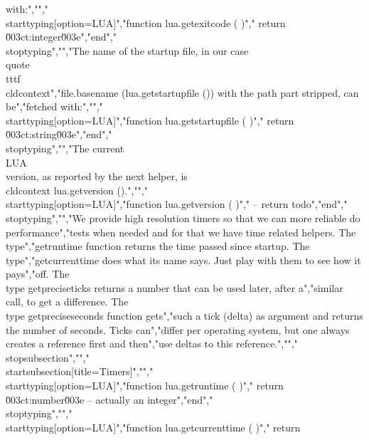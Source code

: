 with:","","\\starttyping[option=LUA]","function lua.getexitcode ( )","    return \u003ct:integer\u003e","end","\\stoptyping","","The name of the startup file, in our case \\quote {\\tttf \\cldcontext","{file.basename (lua.getstartupfile ())}} with the path part stripped, can be","fetched with:","","\\starttyping[option=LUA]","function lua.getstartupfile ( )","    return \u003ct:string\u003e","end","\\stoptyping","","The current \\LUA\\ version, as reported by the next helper, is \\cldcontext {lua.getversion ()}.","","\\starttyping[option=LUA]","function lua.getversion ( )","    -- return todo","end","\\stoptyping","","We provide high resolution timers so that we can more reliable do performance","tests when needed and for that we have time related helpers. The \\type","{getruntime} function returns the time passed since startup. The \\type","{getcurrenttime} does what its name says. Just play with them to see how it pays","off. The \\type {getpreciseticks} returns a number that can be used later, after a","similar call, to get a difference. The \\type {getpreciseseconds} function gets","such a tick (delta) as argument and returns the number of seconds. Ticks can","differ per operating system, but one always creates a reference first and then","use deltas to this reference.","","\\stopsubsection","","\\startsubsection[title=Timers]","","\\starttyping[option=LUA]","function lua.getruntime ( )","    return \u003ct:number\u003e -- actually an integer","end","\\stoptyping","","\\starttyping[option=LUA]","function lua.getcurrenttime ( )","    return 